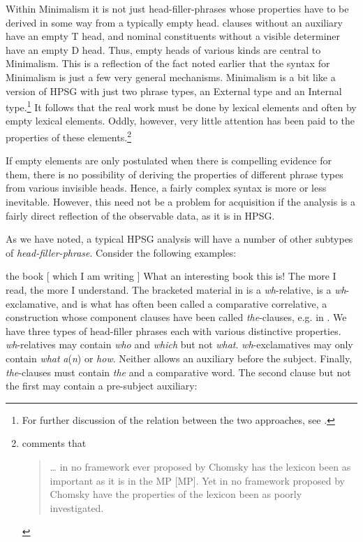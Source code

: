 \documentclass[output=paper]{langsci/langscibook}
\begin{document}
Within Minimalism it is not just head-filler-phrases whose properties have to
be derived in some way from a typically empty head.  clauses without an
auxiliary have an empty T head, and  nominal constituents without a
visible determiner have an empty D head. Thus, empty heads of various kinds are
central to Minimalism. This is a reflection of the fact noted earlier that the
syntax for Minimalism is just a few very general mechanisms. Minimalism is a
bit like a version of \gls{HPSG} with just two phrase types, an External 
type and an Internal  type.\footnote{For further discussion of the
relation between the two approaches, see \citet{Muller2013}.} It follows that
the real work must be done by lexical elements and often by empty lexical
elements. Oddly, however, very little attention has been paid to the properties
of these elements.\footnote{\textcite[95, fn.\ 9]{Newmeyer2005} comments that
    \blockquote{\dots{} in no framework ever proposed by Chomsky has the
lexicon been as important as it is in the \gls{MP} [\glsdesc{MP}].
Yet in no framework proposed by Chomsky have the properties of the lexicon been
as poorly investigated.}}

If empty elements are only postulated when there is compelling evidence for
them, there is no possibility of deriving the properties of different phrase
types from various invisible heads. Hence, a fairly complex syntax is more or
less inevitable. However, this need not be a problem for acquisition if the
analysis is a fairly direct reflection of the observable data, as it is in
\gls{HPSG}.

As we have noted, a typical \gls{HPSG} analysis will have a number of other
subtypes of \emph{head-filler-phrase}. Consider the following examples:

\ea\label{ex:key:4.9}
    the book [ which I am writing ]
\z
\ea\label{ex:key:4.10}
    What an interesting book this is!
\z
\ea\label{ex:key:4.11}
    The more I read, the more I understand.
\z
%
The bracketed material in  is a \emph{wh}-relative,
 is a \emph{wh}-exclamative, and  is what has
often been called a comparative correlative, a construction whose component
clauses have been called \emph{the}{}-clauses, e.g. in \citet{Borsley2011}. We
have three types of head-filler phrases each with various distinctive
properties. \emph{wh}-relatives may contain \emph{who} and \emph{which} but not
\emph{what}. \emph{wh}-exclamatives may only contain \emph{what}
\emph{a}(\emph{n}) or \emph{how}. Neither allows an auxiliary before the
subject. Finally, \emph{the}{}-clauses must contain \emph{the} and a
comparative word. The second clause but not the first may contain a pre-subject
auxiliary:
\end{document}
